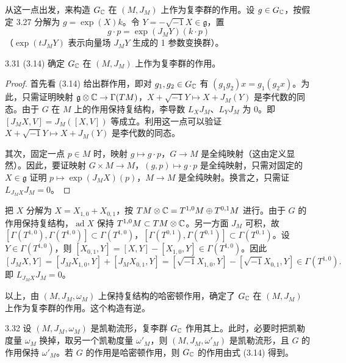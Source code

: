 从这一点出发，来构造 $G_{\mathbb{C}}$ 在 $(M,J_M)$ 上作为复李群的作用。设 $g\in G_{\mathbb{C}}$，按假定 3.27 分解为 $g=\exp(X)k$。令 $Y=-\sqrt{-1}X\in\mathfrak{g}$，置
\begin{equation}
  g\cdot p=\exp(J_MY)(k\cdot p) \tag{3.14}
\end{equation}
（$\exp(tJ_MY)$ 表示向量场 $J_MY$ 生成的 1 参数变换群）。

\begin{proposition*}{3.31}
  (3.14) 确定 $G_{\mathbb{C}}$ 在 $(M,J_M)$ 上作为复李群的作用。
\end{proposition*}

\begin{proof}
  首先看 (3.14) 给出群作用，即对 $g_1,g_2\in G_{\mathbb{C}}$ 有 $(g_1g_2)x=g_1(g_2x)$。为此，只需证明映射 $\mathfrak{g}\otimes\mathbb{C}\to\Gamma(TM)$，$X+\sqrt{-1}Y\mapsto X+J_M(Y)$ 是李代数的同态。由于 $G$ 在 $M$ 上的作用保持复结构，李导数 $L_XJ_M$、$L_YJ_M$ 为 0。即 $[J_MX,V]=J_M([X,V])$ 等成立。利用这一点可以验证 $X+\sqrt{-1}Y\mapsto X+J_M(Y)$ 是李代数的同态。

  其次，固定一点 $p\in M$ 时，映射 $g\mapsto g\cdot p$，$G\to M$ 是全纯映射（这由定义显然）。因此，要证映射 $G\times M\to M$，$(g,p)\mapsto g\cdot p$ 是全纯映射，只需对固定的 $X\in\mathfrak{g}$ 证明 $p\mapsto\exp(J_MX)(p)$，$M\to M$ 是全纯映射。换言之，只需证 $L_{J_MX}J_M=0$。
\end{proof}


把 $X$ 分解为 $X=X_{1,0}+X_{0,1}$，按 $TM\otimes\mathbb{C}=T^{1,0}M\oplus T^{0,1}M$ 进行。由于 $G$ 的作用保持复结构，$\operatorname{ad}X$ 保持 $T^{1,0}M\subset TM\otimes\mathbb{C}$。另一方面 $J_M$ 可积，故 $[\Gamma(T^{1,0}),\Gamma(T^{1,0})]\subset\Gamma(T^{1,0})$，$[\Gamma(T^{0,1}),\Gamma(T^{0,1})]\subset\Gamma(T^{0,1})$。设 $Y\in\Gamma(T^{1,0})$，则 $[X_{0,1},Y]=[X,Y]-[X_{1,0},Y]\in\Gamma(T^{1,0})$。因此
\[
  [J_MX,Y]=[J_MX_{1,0},Y]+[J_MX_{0,1},Y]
  =[\sqrt{-1}X_{1,0},Y]-[\sqrt{-1}X_{0,1},Y]\in\Gamma(T^{1,0}).
\]
即 $L_{J_MX}J_M=0$。

以上，由 $(M,J_M,\omega_M)$ 上保持复结构的哈密顿作用，确定了 $G_{\mathbb{C}}$ 在 $(M,J_M)$ 上作为复李群的作用。这个构造有逆。

\begin{lemma*}{3.32}
  设 $(M,J_M,\omega_M)$ 是凯勒流形，复李群 $G_{\mathbb{C}}$ 作用其上。此时，必要时把凯勒度量 $\omega_M$ 换掉，取另一个凯勒度量 $\omega'_M$，则 $(M,J_M,\omega'_M)$ 是凯勒流形，且 $G$ 的作用保持 $\omega'_M$。若 $G$ 的作用是哈密顿作用，则 $G_{\mathbb{C}}$ 的作用由式 (3.14) 得到。
\end{lemma*}

